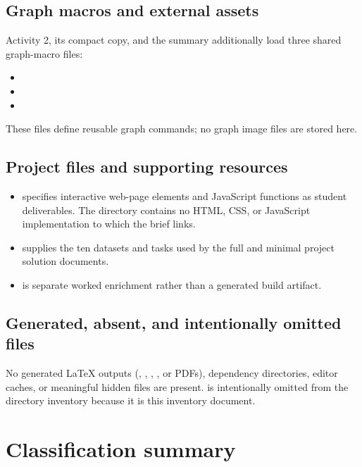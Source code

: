 \subsection{Graph macros and external assets}

Activity 2, its compact copy, and the summary additionally load three shared graph-macro files:
\begin{itemize}
  \item {}
  \item {}
  \item {}
\end{itemize}
These files define reusable graph commands; no graph image files are stored here.

\subsection{Project files and supporting resources}

\begin{itemize}
  \item {} specifies interactive web-page elements and JavaScript functions as student deliverables. The directory contains no HTML, CSS, or JavaScript implementation to which the brief links.
  \item {} supplies the ten datasets and tasks used by the full and minimal project solution documents.
  \item {} is separate worked enrichment rather than a generated build artifact.
\end{itemize}

\subsection{Generated, absent, and intentionally omitted files}

No generated LaTeX outputs (, , , , or PDFs), dependency directories, editor caches, or meaningful hidden files are present.  is intentionally omitted from the directory inventory because it is this inventory document.

\section{Classification summary}

